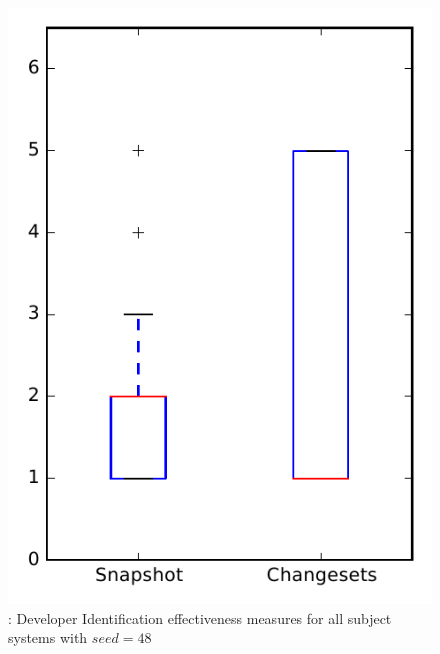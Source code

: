 
\begin{figure}
\centering
\includegraphics[height=0.4\textheight]{figures/dit_seed/rq1_overview_48}
\caption{\rtwo: Developer Identification effectiveness measures for all subject systems with $seed=48$}
\label{fig:dit_seed:rq1:overview}
\end{figure}

